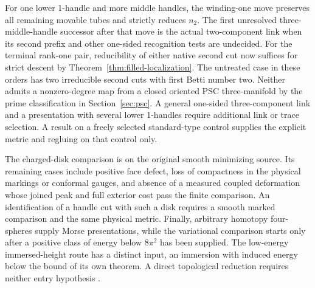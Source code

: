 \documentclass[11pt,letterpaper]{article}
\numberwithin{equation}{section}
\theoremstyle{remark}
\begin{document}
For one lower 1-handle and more middle handles, the
winding-one move preserves all remaining movable tubes
and strictly reduces \(n_2\). The first unresolved
three-middle-handle successor after that move is the
actual two-component link when its second prefix and
other one-sided recognition tests are undecided.
For the terminal rank-one pair, reducibility of either native second cut
now suffices for strict descent by Theorem~\ref{thm:filled-localization}.
The untreated case in these orders has two irreducible second cuts
with first Betti number two. Neither admits a nonzero-degree map from
a closed oriented PSC three-manifold by the prime classification in
Section~\ref{sec:psc}.
A general one-sided three-component link and a presentation
with several lower 1-handles require additional link
or trace selection. A result on a freely selected
standard-type control supplies the explicit metric and
regluing on that control only.

The charged-disk comparison is on the original smooth
minimizing source. Its remaining cases include positive
face defect, loss of compactness in the physical markings
or conformal gauges, and absence of a measured coupled
deformation whose joined peak and full exterior cost pass
the finite comparison. An identification of a handle cut
with such a disk requires a smooth marked comparison
and the same physical metric. Finally, arbitrary homotopy
four-spheres supply Morse presentations, while the
variational comparison starts only after a positive class
of energy below \(8\pi^2\) has been supplied. The low-energy
immersed-height route has a distinct input, an immersion
with induced energy below the bound of its own theorem.
A direct topological reduction requires neither entry
hypothesis \cite{Baker2026MarkedHeights,Baker2026ChiralMaster,Baker2026CollarProgram}.

\begingroup
\raggedright


\endgroup
\end{document}
